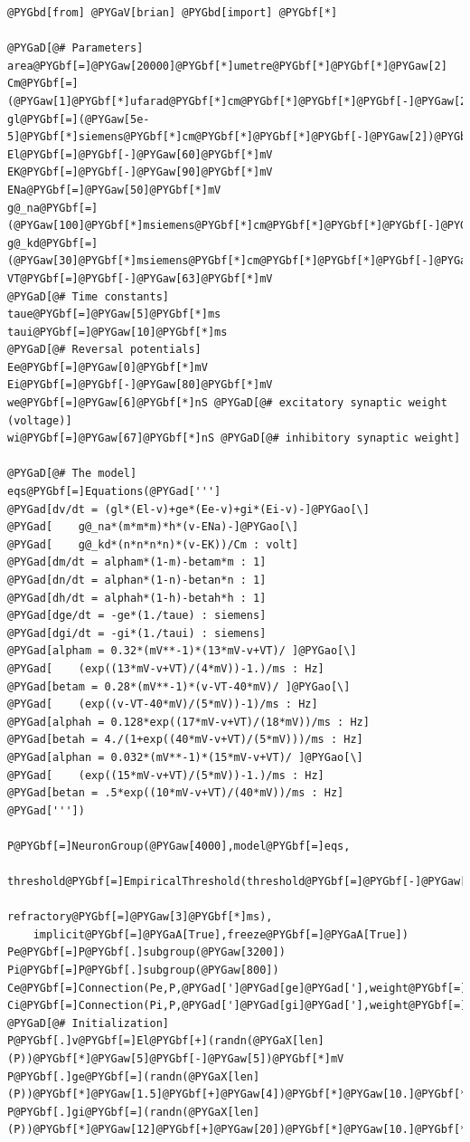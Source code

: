 \documentclass[letterpaper,10pt,english]{manual}
\begin{document}
\begin{Verbatim}[commandchars=@\[\]]
@PYGbd[from] @PYGaV[brian] @PYGbd[import] @PYGbf[*]

@PYGaD[@# Parameters]
area@PYGbf[=]@PYGaw[20000]@PYGbf[*]umetre@PYGbf[*]@PYGbf[*]@PYGaw[2]
Cm@PYGbf[=](@PYGaw[1]@PYGbf[*]ufarad@PYGbf[*]cm@PYGbf[*]@PYGbf[*]@PYGbf[-]@PYGaw[2])@PYGbf[*]area
gl@PYGbf[=](@PYGaw[5e-5]@PYGbf[*]siemens@PYGbf[*]cm@PYGbf[*]@PYGbf[*]@PYGbf[-]@PYGaw[2])@PYGbf[*]area
El@PYGbf[=]@PYGbf[-]@PYGaw[60]@PYGbf[*]mV
EK@PYGbf[=]@PYGbf[-]@PYGaw[90]@PYGbf[*]mV
ENa@PYGbf[=]@PYGaw[50]@PYGbf[*]mV
g@_na@PYGbf[=](@PYGaw[100]@PYGbf[*]msiemens@PYGbf[*]cm@PYGbf[*]@PYGbf[*]@PYGbf[-]@PYGaw[2])@PYGbf[*]area
g@_kd@PYGbf[=](@PYGaw[30]@PYGbf[*]msiemens@PYGbf[*]cm@PYGbf[*]@PYGbf[*]@PYGbf[-]@PYGaw[2])@PYGbf[*]area
VT@PYGbf[=]@PYGbf[-]@PYGaw[63]@PYGbf[*]mV
@PYGaD[@# Time constants]
taue@PYGbf[=]@PYGaw[5]@PYGbf[*]ms
taui@PYGbf[=]@PYGaw[10]@PYGbf[*]ms
@PYGaD[@# Reversal potentials]
Ee@PYGbf[=]@PYGaw[0]@PYGbf[*]mV
Ei@PYGbf[=]@PYGbf[-]@PYGaw[80]@PYGbf[*]mV
we@PYGbf[=]@PYGaw[6]@PYGbf[*]nS @PYGaD[@# excitatory synaptic weight (voltage)]
wi@PYGbf[=]@PYGaw[67]@PYGbf[*]nS @PYGaD[@# inhibitory synaptic weight]

@PYGaD[@# The model]
eqs@PYGbf[=]Equations(@PYGad[''']
@PYGad[dv/dt = (gl*(El-v)+ge*(Ee-v)+gi*(Ei-v)-]@PYGao[\]
@PYGad[    g@_na*(m*m*m)*h*(v-ENa)-]@PYGao[\]
@PYGad[    g@_kd*(n*n*n*n)*(v-EK))/Cm : volt]
@PYGad[dm/dt = alpham*(1-m)-betam*m : 1]
@PYGad[dn/dt = alphan*(1-n)-betan*n : 1]
@PYGad[dh/dt = alphah*(1-h)-betah*h : 1]
@PYGad[dge/dt = -ge*(1./taue) : siemens]
@PYGad[dgi/dt = -gi*(1./taui) : siemens]
@PYGad[alpham = 0.32*(mV**-1)*(13*mV-v+VT)/ ]@PYGao[\]
@PYGad[    (exp((13*mV-v+VT)/(4*mV))-1.)/ms : Hz]
@PYGad[betam = 0.28*(mV**-1)*(v-VT-40*mV)/ ]@PYGao[\]
@PYGad[    (exp((v-VT-40*mV)/(5*mV))-1)/ms : Hz]
@PYGad[alphah = 0.128*exp((17*mV-v+VT)/(18*mV))/ms : Hz]
@PYGad[betah = 4./(1+exp((40*mV-v+VT)/(5*mV)))/ms : Hz]
@PYGad[alphan = 0.032*(mV**-1)*(15*mV-v+VT)/ ]@PYGao[\]
@PYGad[    (exp((15*mV-v+VT)/(5*mV))-1.)/ms : Hz]
@PYGad[betan = .5*exp((10*mV-v+VT)/(40*mV))/ms : Hz]
@PYGad['''])

P@PYGbf[=]NeuronGroup(@PYGaw[4000],model@PYGbf[=]eqs,
    threshold@PYGbf[=]EmpiricalThreshold(threshold@PYGbf[=]@PYGbf[-]@PYGaw[20]@PYGbf[*]mV,
                                 refractory@PYGbf[=]@PYGaw[3]@PYGbf[*]ms),
    implicit@PYGbf[=]@PYGaA[True],freeze@PYGbf[=]@PYGaA[True])
Pe@PYGbf[=]P@PYGbf[.]subgroup(@PYGaw[3200])
Pi@PYGbf[=]P@PYGbf[.]subgroup(@PYGaw[800])
Ce@PYGbf[=]Connection(Pe,P,@PYGad[']@PYGad[ge]@PYGad['],weight@PYGbf[=]we,sparseness@PYGbf[=]@PYGaw[0.02])
Ci@PYGbf[=]Connection(Pi,P,@PYGad[']@PYGad[gi]@PYGad['],weight@PYGbf[=]wi,sparseness@PYGbf[=]@PYGaw[0.02])
@PYGaD[@# Initialization]
P@PYGbf[.]v@PYGbf[=]El@PYGbf[+](randn(@PYGaX[len](P))@PYGbf[*]@PYGaw[5]@PYGbf[-]@PYGaw[5])@PYGbf[*]mV
P@PYGbf[.]ge@PYGbf[=](randn(@PYGaX[len](P))@PYGbf[*]@PYGaw[1.5]@PYGbf[+]@PYGaw[4])@PYGbf[*]@PYGaw[10.]@PYGbf[*]nS
P@PYGbf[.]gi@PYGbf[=](randn(@PYGaX[len](P))@PYGbf[*]@PYGaw[12]@PYGbf[+]@PYGaw[20])@PYGbf[*]@PYGaw[10.]@PYGbf[*]nS


\end{Verbatim}
\end{document}
